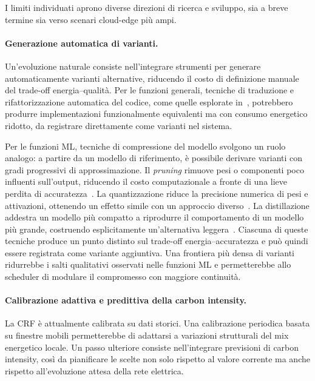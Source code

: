 I limiti individuati aprono diverse direzioni di ricerca e sviluppo, sia a
breve termine sia verso scenari cloud-edge più ampi.

\paragraph{Generazione automatica di varianti.}
Un'evoluzione naturale consiste nell'integrare strumenti per generare
automaticamente varianti alternative, riducendo il costo di definizione
manuale del trade-off energia--qualità. Per le funzioni generali, tecniche
di traduzione e rifattorizzazione automatica del codice, come quelle
esplorate in~\cite{refaas}, potrebbero produrre implementazioni
funzionalmente equivalenti ma con consumo energetico ridotto, da registrare
direttamente come varianti nel sistema.

Per le funzioni ML, tecniche di compressione del modello svolgono un ruolo
analogo: a partire da un modello di riferimento, è possibile derivare
varianti con gradi progressivi di approssimazione. Il \emph{pruning} rimuove
pesi o componenti poco influenti sull'output, riducendo il costo
computazionale a fronte di una lieve perdita di accuratezza~\cite{han2016deepcompression}.
La quantizzazione riduce la precisione numerica di pesi e attivazioni,
ottenendo un effetto simile con un approccio diverso~\cite{han2016deepcompression}.
La distillazione addestra un modello più compatto a riprodurre il
comportamento di un modello più grande, costruendo esplicitamente
un'alternativa leggera~\cite{hinton2015distilling}. Ciascuna di queste
tecniche produce un punto distinto sul trade-off energia--accuratezza e può
quindi essere registrata come variante aggiuntiva. Una frontiera più densa
di varianti ridurrebbe i salti qualitativi osservati nelle funzioni ML e
permetterebbe allo scheduler di modulare il compromesso con maggiore
continuità.


\paragraph{Calibrazione adattiva e predittiva della carbon intensity.}
La CRF è attualmente calibrata su dati storici. Una calibrazione
periodica basata su finestre mobili permetterebbe di adattarsi a variazioni
strutturali del mix energetico locale. Un passo ulteriore consiste
nell'integrare previsioni di carbon intensity, così da pianificare le scelte
non solo rispetto al valore corrente ma anche rispetto all'evoluzione
attesa della rete elettrica.

